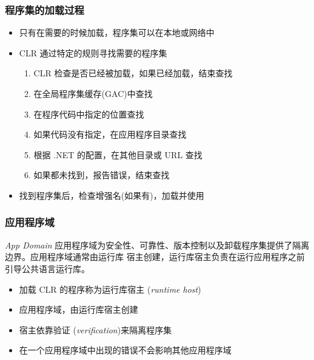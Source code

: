 \begin{frame}
\frametitle{程序集的加载过程}
\begin{itemize}
  \setlength{\itemsep}{8pt plus 1pt}
\item 只有在需要的时候加载，程序集可以在本地或网络中

\item CLR 通过特定的规则寻找需要的程序集

  \begin{enumerate}
    \setlength{\itemsep}{4pt plus 1pt}
  \item CLR 检查是否已经被加载，如果已经加载，结束查找
  \item 在全局程序集缓存(GAC)中查找
  \item 在程序代码中指定的位置查找
  \item 如果代码没有指定，在应用程序目录查找
  \item 根据 .NET 的配置，在其他目录或 URL 查找
  \item 如果都未找到，报告错误，结束查找
  \end{enumerate}

\item 找到程序集后，检查增强名(如果有)，加载并使用
\end{itemize}
\end{frame}


\begin{frame}
\frametitle{应用程序域}
\begin{block}{\textit{App Domain}}
  \CJKindent 应用程序域为安全性、可靠性、版本控制以及卸载程序集提供了隔离边界。应用程序域通常由运行库
  宿主创建，运行库宿主负责在运行应用程序之前引导公共语言运行库。
\end{block}
\pause
\begin{itemize}
\item 加载 CLR 的程序称为{运行库宿主} (\textit{runtime host})
\item 应用程序域，由运行库宿主创建
\item 宿主依靠{验证} (\textit{verification})来隔离程序集
\item 在一个应用程序域中出现的错误不会影响其他应用程序域
\end{itemize}
\end{frame}


